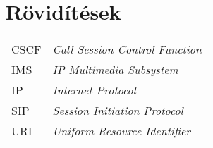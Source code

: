 

\section{Rövidítések}
\label{sec:roviditesek}

\begin{tabular}{p{2cm}l}
CSCF & \emph{Call Session Control Function} \\
IMS & \emph{IP Multimedia Subsystem} \\
IP & \emph{Internet Protocol} \\
SIP & \emph{Session Initiation Protocol} \\
URI & \emph{Uniform Resource Identifier} \\
\end{tabular}

